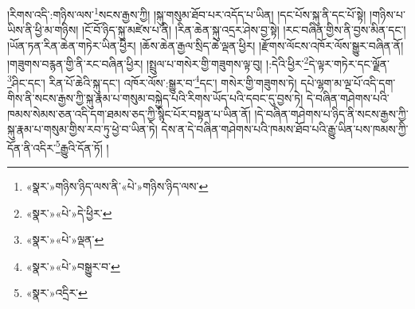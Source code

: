 །རིགས་འདི་:གཉིས་ལས་\footnote{«སྣར་»གཉིས་ཉིད་ལས་ནི་«པེ་»གཉིས་ཉིད་ལས་}སངས་རྒྱས་ཀྱི། །སྐུ་གསུམ་ཐོབ་པར་འདོད་པ་ཡིན། །དང་པོས་སྐུ་ནི་དང་པོ་སྟེ། །གཉིས་པ་ཡིས་ནི་ཕྱི་མ་གཉིས། །ངོ་བོ་ཉིད་སྐུ་མཛེས་པ་ནི། །རིན་ཆེན་སྐུ་འདྲར་ཤེས་བྱ་སྟེ། །རང་བཞིན་གྱིས་ནི་བྱས་མིན་དང་། །ཡོན་ཏན་རིན་ཆེན་གཏེར་ཡིན་ཕྱིར། །ཆོས་ཆེན་རྒྱལ་སྲིད་ཆེ་ལྡན་ཕྱིར། །རྫོགས་ལོངས་འཁོར་ལོས་སྒྱུར་བཞིན་ནོ། །གཟུགས་བརྙན་གྱི་ནི་རང་བཞིན་ཕྱིར། །སྤྲུལ་པ་གསེར་གྱི་གཟུགས་ལྟ་བུ། །:དེའི་ཕྱིར་\footnote{«སྣར་»«པེ་»དེ་ཕྱིར་}དེ་ལྟར་གཏེར་དང་ལྗོན་\footnote{«སྣར་»«པེ་»ལྡན་}ཤིང་དང་། རིན་པོ་ཆེའི་སྐུ་དང་། འཁོར་ལོས་:སྒྱུར་བ་\footnote{«སྣར་»«པེ་»བསྒྱུར་བ་}དང་། གསེར་གྱི་གཟུགས་ཏེ། དཔེ་ལྷག་མ་ལྔ་པོ་འདི་དག་གིས་ནི་སངས་རྒྱས་ཀྱི་སྐུ་རྣམ་པ་གསུམ་བསྐྱེད་པའི་རིགས་ཡོད་པའི་དབང་དུ་བྱས་ཏེ། དེ་བཞིན་གཤེགས་པའི་ཁམས་སེམས་ཅན་འདི་དག་ཐམས་ཅད་ཀྱི་སྙིང་པོར་བསྟན་པ་ཡིན་ནོ། །དེ་བཞིན་གཤེགས་པ་ཉིད་ནི་སངས་རྒྱས་ཀྱི་སྐུ་རྣམ་པ་གསུམ་གྱིས་རབ་ཏུ་ཕྱེ་བ་ཡིན་ཏེ། དེས་ན་དེ་བཞིན་གཤེགས་པའི་ཁམས་ཐོབ་པའི་རྒྱུ་ཡིན་པས་ཁམས་ཀྱི་དོན་ནི་འདིར་\footnote{«སྣར་»འདྲིར་}རྒྱུའི་དོན་ཏོ། །
